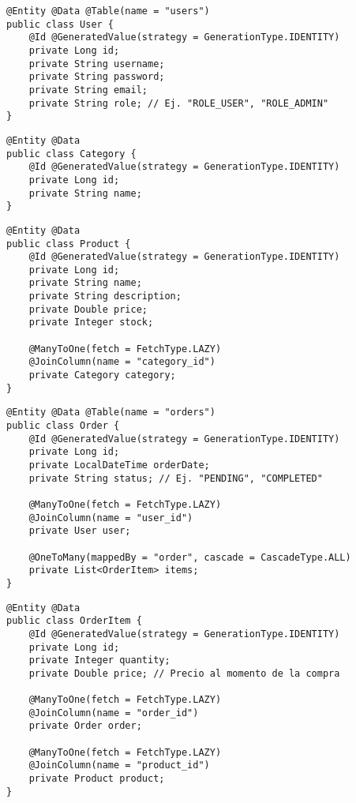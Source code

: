 \documentclass[12pt, a4paper]{article}
\begin{document}
\begin{lstlisting}[style=javastyle, caption={Entidad `User`}, label=lst:user]
@Entity @Data @Table(name = "users")
public class User {
    @Id @GeneratedValue(strategy = GenerationType.IDENTITY)
    private Long id;
    private String username;
    private String password;
    private String email;
    private String role; // Ej. "ROLE_USER", "ROLE_ADMIN"
}
\end{lstlisting}

\begin{lstlisting}[style=javastyle, caption={Entidad `Category`}, label=lst:category]
@Entity @Data
public class Category {
    @Id @GeneratedValue(strategy = GenerationType.IDENTITY)
    private Long id;
    private String name;
}
\end{lstlisting}

\begin{lstlisting}[style=javastyle, caption={Entidad `Product`}, label=lst:product]
@Entity @Data
public class Product {
    @Id @GeneratedValue(strategy = GenerationType.IDENTITY)
    private Long id;
    private String name;
    private String description;
    private Double price;
    private Integer stock;

    @ManyToOne(fetch = FetchType.LAZY)
    @JoinColumn(name = "category_id")
    private Category category;
}
\end{lstlisting}

\begin{lstlisting}[style=javastyle, caption={Entidad `Order`}, label=lst:order]
@Entity @Data @Table(name = "orders")
public class Order {
    @Id @GeneratedValue(strategy = GenerationType.IDENTITY)
    private Long id;
    private LocalDateTime orderDate;
    private String status; // Ej. "PENDING", "COMPLETED"

    @ManyToOne(fetch = FetchType.LAZY)
    @JoinColumn(name = "user_id")
    private User user;

    @OneToMany(mappedBy = "order", cascade = CascadeType.ALL)
    private List<OrderItem> items;
}
\end{lstlisting}

\begin{lstlisting}[style=javastyle, caption={Entidad `OrderItem`}, label=lst:orderitem]
@Entity @Data
public class OrderItem {
    @Id @GeneratedValue(strategy = GenerationType.IDENTITY)
    private Long id;
    private Integer quantity;
    private Double price; // Precio al momento de la compra

    @ManyToOne(fetch = FetchType.LAZY)
    @JoinColumn(name = "order_id")
    private Order order;

    @ManyToOne(fetch = FetchType.LAZY)
    @JoinColumn(name = "product_id")
    private Product product;
}
\end{lstlisting}
\end{document}
